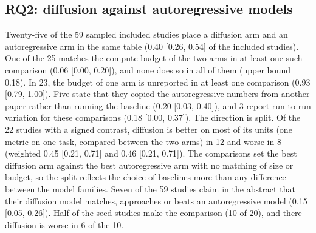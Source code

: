 \subsection{RQ2: diffusion against autoregressive models}
\label{sec:rq2}
Twenty-five of the 59 sampled included studies place a diffusion arm and an autoregressive arm in the same table (0.40 [0.26, 0.54] of the included studies). One of the 25 matches the compute budget of the two arms in at least one such comparison (0.06 [0.00, 0.20]), and none does so in all of them (upper bound 0.18). In 23, the budget of one arm is unreported in at least one comparison (0.93 [0.79, 1.00]). Five state that they copied the autoregressive numbers from another paper rather than running the baseline (0.20 [0.03, 0.40]), and 3 report run-to-run variation for these comparisons (0.18 [0.00, 0.37]). %
The direction is split. Of the 22 studies with a signed contrast, diffusion is better on most of its units (one metric on one task, compared between the two arms) in 12 and worse in 8 (weighted 0.45 [0.21, 0.71] and 0.46 [0.21, 0.71]). The comparisons set the best diffusion arm against the best autoregressive arm with no matching of size or budget, so the split reflects the choice of baselines more than any difference between the model families. Seven of the 59 studies claim in the abstract that their diffusion model matches, approaches or beats an autoregressive model (0.15 [0.05, 0.26]). Half of the seed studies make the comparison (10 of 20), and there diffusion is worse in 6 of the 10. %
